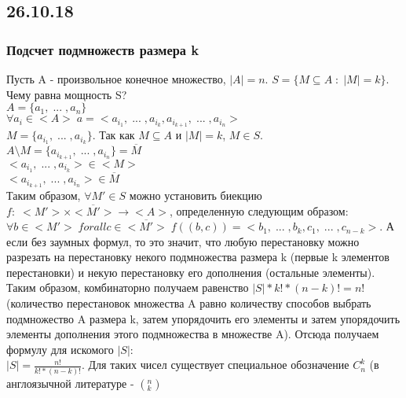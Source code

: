 \subsection{26.10.18}
\subsubsection{Подсчет подмножеств размера k}
Пусть A - произвольное конечное множество, $|A| = n$. $S = \{M \subseteq A \; : \; |M| = k\}$. Чему равна мощность S? \\
$A = \{a_1, \; ... \; , a_n\}$\\
$\forall a_i \in <A> \; a = <a_{i_1}, \; ... \; , a_{i_k}, a_{i_{k + 1}}, \; ... \; , a_{i_n}>$\\
$M = \{a_{i_1}, \; ... \; , a_{i_k}\}$. Так как $M \subseteq A$ и $|M| = k$, $M \in S$.\\
$A \setminus M = \{a_{i_{k + 1}}, \; ... \; , a_{i_n}\} = \overline{M}$\\
$<a_{i_1}, \; ... \; , a_{i_k}> \in <M>$\\
$<a_{i_{k + 1}}, \; ... \; , a_{i_n}> \in \overline{M}$\\
Таким образом, $\forall M' \in S$ можно установить биекцию $f: \; <M'> \times <\overline{M'}> \rightarrow <A>$, определенную следующим образом: $\forall b \in <M'> \; forall c \in <\overline{M'}> \; f((b, c)) = <b_1, \; ... \; , b_k, c_1, \; ... \; , c_{n - k}>$. А если без заумных формул, то это значит, что любую перестановку можно разрезать на перестановку некого подмножества размера k (первые k элементов перестановки) и некую перестановку его дополнения (остальные элементы).\\
Таким образом, комбинаторно получаем равенство $|S| * k! * (n - k)! = n!$ (количество перестановок множества A равно количеству способов выбрать подмножество A размера k, затем упорядочить его элементы и затем упорядочить элементы дополнения этого подмножества в множестве A). Отсюда получаем формулу для искомого $|S|$:\\
$|S| = \frac{n!}{k! * (n - k)!}$. Для таких чисел существует специальное обозначение $C^k_n$ (в англоязычной литературе - $(^n_k)$
